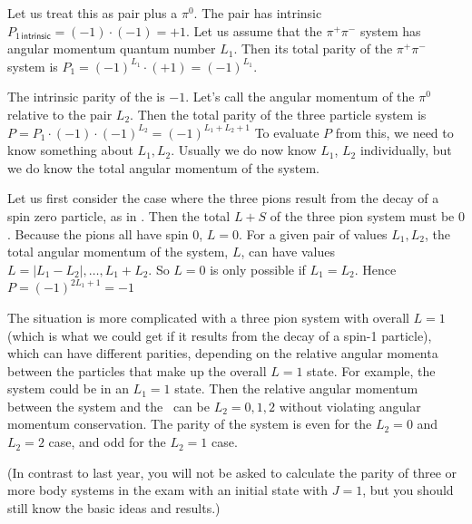 Let us treat this as \prt{\pi^+ \pi^-} pair plus a $\pi^0$. The \prt{\pi^+ \pi^-} pair has intrinsic $P_{1\,\mathsf{intrinsic}}=(-1)\cdot(-1)=+1$. Let us assume that the $\pi^+ \pi^-$ system has angular momentum quantum number $L_1$. Then its total parity of the $\pi^+ \pi^-$ system is $P_1 = (-1)^{L_1} \cdot (+1)=(-1)^{L_1}$.

The intrinsic parity of the  is $-1$. Let's call the angular momentum of the $\pi^0$ relative to the \prt{\pi^+ \pi^-} pair $L_2$. Then the total parity of the three particle system is $P = P_1 \cdot (-1) \cdot (-1)^{L_2}= (-1)^{L_1 + L_2 + 1}$
To evaluate $P$ from this, we need to know something about $L_1, L_2$. Usually we do now know $L_1$, $L_2$ individually, but we do know the total angular momentum of the system.

Let us first consider the case where the three pions result from the decay of a spin zero particle, as in . Then the total $L+S$ of the three pion system must be $0$. Because the pions all have spin $0$, $L=0$. For a given pair of values $L_1, L_2$, the total angular momentum of the system, $L$, can have values 
$L = |L_1 - L_2|, \ldots, L_1 + L_2$. So $L=0$ is only possible if $L_1 = L_2$. Hence $P =  (-1)^{2L_1 + 1} = -1$

The situation is more complicated with a three pion system with overall $L=1$ (which is what we could get if it results from the decay of a spin-1 particle), which can have different parities, depending on the relative angular momenta between the particles that make up the overall $L=1$ state. For example, the \prt{\pi^+\pi^-} system could be in an $L_1 =1$ state. Then the relative angular momentum between the \prt{(\pi^+\pi^-)} system and the \piz\ can be $L_2 = 0, 1, 2$ without violating angular momentum conservation. The parity of the system is even for the $L_2 = 0$ and $L_2 = 2$ case, and odd for the $L_2 = 1$ case.

(In contrast to last year, you will not be asked to calculate the parity of three or more body systems in the exam with an initial state with $J=1$, but you should still know the basic ideas and results.)

